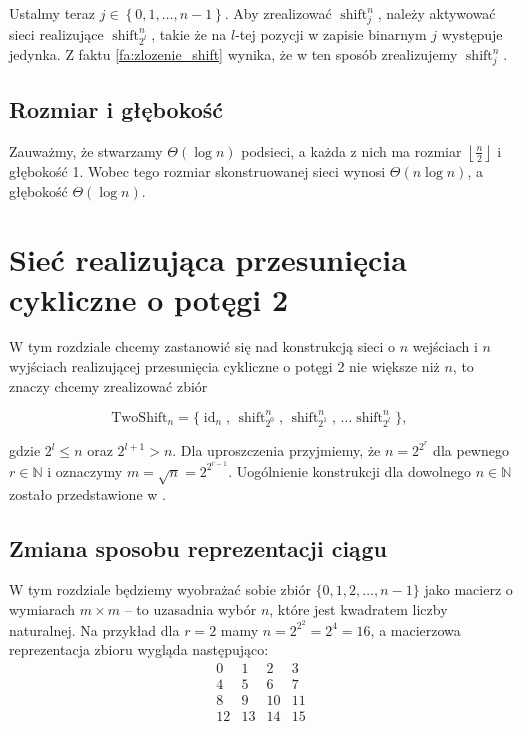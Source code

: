 \documentclass[a4paper]{article}
\newcommand{\shift}[2]{\operatorname{shift}_{#2}^{#1}}
\newcommand{\id}[1]{\operatorname{id}_{#1}}
\newcommand{\tc}{\text{, }}
\newcommand{\floor}[1]{\left\lfloor #1 \right\rfloor}
\newcommand{\twoshift}[1]{\text{TwoShift}_{#1}}
\newcommand{\N}{\mathbb{N}}
\newcommand{\lt}{\left}
\newcommand{\rt}{\right}
\theoremstyle{definition}
\begin{document}
\vspace{.5em}

Ustalmy teraz \(j \in \lt\{ 0, 1, \ldots, n-1 \rt\}\). Aby zrealizować \(\shift n j\), należy aktywować sieci realizujące \(\shift n {2^l}\), takie że na \(l\)-tej pozycji w zapisie binarnym \(j\) występuje jedynka. Z  faktu \ref{fa:zlozenie_shift} wynika, że w ten sposób zrealizujemy \(\shift n j\). 

\subsection{Rozmiar i głębokość}

Zauważmy, że stwarzamy \(\Theta(\log n)\) podsieci, a każda z nich ma rozmiar  \(\floor{\frac n 2}\) i głębokość 1. Wobec tego rozmiar skonstruowanej sieci wynosi \(\Theta(n \log n)\), a głębokość \(\Theta(\log n)\).


\section{Sieć realizująca przesunięcia cykliczne o potęgi 2}

W tym rozdziale chcemy zastanowić się nad konstrukcją sieci o \(n\) wejściach i \(n\) wyjściach realizującej przesunięcia cykliczne o potęgi 2 nie większe niż \(n\), to znaczy chcemy zrealizować zbiór

\[
\twoshift{n} = \{ \id n \tc \shift n {2^0} \tc \shift n {2^1} \tc \ldots \shift n {2^l}\} \tc
\]

gdzie \(2^l \leq n\) oraz \(2^{l+1} > n\). Dla uproszczenia przyjmiemy, że \(n = 2^{2^r}\) dla pewnego \(r \in \N\) i oznaczymy \( m = \sqrt{n} = 2^{2^{r-1}} \). Uogólnienie konstrukcji dla dowolnego \(n \in \N\) zostało przedstawione w \cite{klo}.


\subsection{Zmiana sposobu reprezentacji ciągu}

W tym rozdziale będziemy wyobrażać sobie zbiór \(\{0, 1, 2, \ldots, n-1\}\) jako macierz o wymiarach \(m \times m\) -- to uzasadnia wybór \(n\), które jest kwadratem liczby naturalnej. Na przykład dla \(r = 2\) mamy \(n = 2^{2^2} = 2^4 = 16\), a macierzowa reprezentacja zbioru wygląda następująco:
\[
\begin{matrix}
 0 &  1 &  2 &  3 \\
 4 &  5 &  6 &  7 \\
 8 &  9 & 10 & 11 \\
12 & 13 & 14 & 15
\end{matrix}
\]
\end{document}
